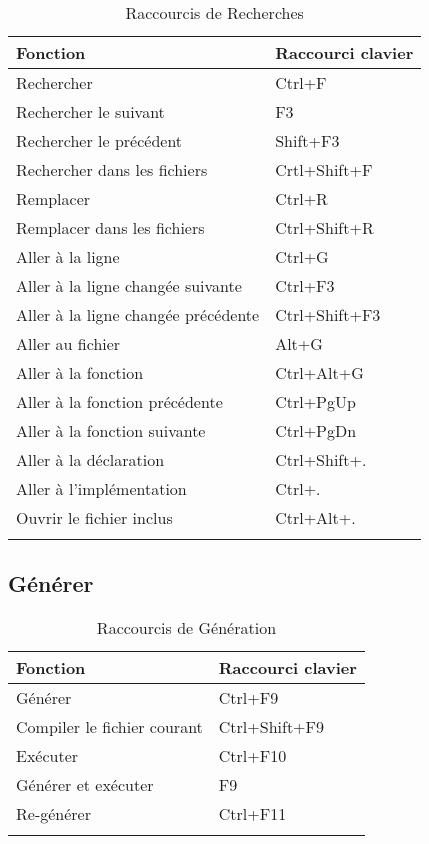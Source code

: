 {\small 
\begin{longtable}{|l|l|}\hline
\textbf{Fonction}		            &	\textbf{Raccourci clavier}  \\ \hline
\endhead    %
Rechercher 		                    &	Ctrl+F                      \\ \hline
Rechercher le suivant 	            &	F3                          \\ \hline
Rechercher le précédent 	        &	Shift+F3                    \\ \hline
Rechercher dans les fichiers 	    &	Crtl+Shift+F                \\ \hline
Remplacer 	                        &	Ctrl+R                      \\ \hline
Remplacer dans les fichiers         &	Ctrl+Shift+R                \\ \hline
Aller à la ligne 	                &	Ctrl+G                      \\ \hline
Aller à la ligne changée suivante 	&	Ctrl+F3                     \\ \hline
Aller à la ligne changée précédente	&	Ctrl+Shift+F3               \\ \hline
Aller au fichier 	                &	Alt+G                       \\ \hline
Aller à la fonction	                &	Ctrl+Alt+G                  \\ \hline
Aller à la fonction précédente      &   Ctrl+PgUp                   \\ \hline
Aller à la fonction suivante        &   Ctrl+PgDn                   \\ \hline
Aller à la déclaration              &   Ctrl+Shift+.                \\ \hline
Aller à l'implémentation            &   Ctrl+.                      \\ \hline
Ouvrir le fichier inclus            &   Ctrl+Alt+.                  \\ \hline
\caption{Raccourcis de Recherches}
\end{longtable}
}

\subsection{Générer}

{\small 
\begin{longtable}{|l|l|}\hline
\textbf{Fonction}		    &	\textbf{Raccourci clavier}  \\ \hline
\endhead    %
Générer 		            &	Ctrl+F9                     \\ \hline
Compiler le fichier courant	&	Ctrl+Shift+F9               \\ \hline
Exécuter		            &	Ctrl+F10                    \\ \hline
Générer et exécuter 	    &	F9                          \\ \hline
Re-générer 	                &	Ctrl+F11                    \\ \hline
\caption{Raccourcis de Génération}
\end{longtable}
}

